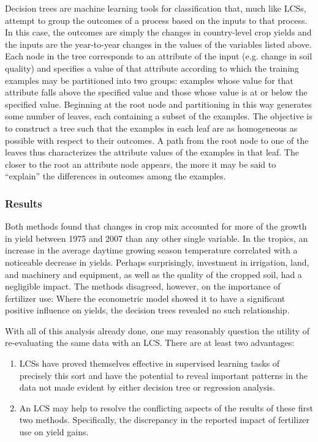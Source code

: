 \documentclass[11pt]{article}
\begin{document}
Decision trees are machine learning tools for classification that, much like LCSs, attempt to group the outcomes of a process based on the inputs to that process. In this case, the outcomes are simply the changes in country-level crop yields and the inputs are the year-to-year changes in the values of the variables listed above. Each node in the tree corresponds to an attribute of the input (e.g. change in soil quality) and specifies a value of that attribute according to which the training examples may be partitioned into two groups: examples whose value for that attribute falls above the specified value and those whose value is at or below the specified value. Beginning at the root node and partitioning in this way generates some number of leaves, each containing a subset of the examples. The objective is to construct a tree such that the examples in each leaf are as homogeneous as possible with respect to their outcomes. A path from the root node to one of the leaves thus characterizes the attribute values of the examples in that leaf. The closer to the root an attribute node appears, the more it may be said to ``explain'' the differences in outcomes among the examples.

\subsubsection{Results}
Both methods found that changes in crop mix accounted for more of the growth in yield between 1975 and 2007 than any other single variable. In the tropics, an increase in the average daytime growing season temperature correlated with a noticeable decrease in yields. Perhaps surprisingly, investment in irrigation, land, and machinery and equipment, as well as the quality of the cropped soil, had a negligible impact. The methods disagreed, however, on the importance of fertilizer use: Where the econometric model showed it to have a significant positive influence on yields, the decision trees revealed no such relationship.

With all of this analysis already done, one may reasonably question the utility of re-evaluating the same data with an LCS. There are at least two advantages:

\begin{enumerate}
\item LCSs have proved themselves effective in supervised learning tasks of precisely this sort and have the potential to reveal important patterns in the data not made evident by either decision tree or regression analysis.
\item An LCS may help to resolve the conflicting aspects of the results of these first two methods. Specifically, the discrepancy in the reported impact of fertilizer use on yield gains.
\end{enumerate}
\end{document}
